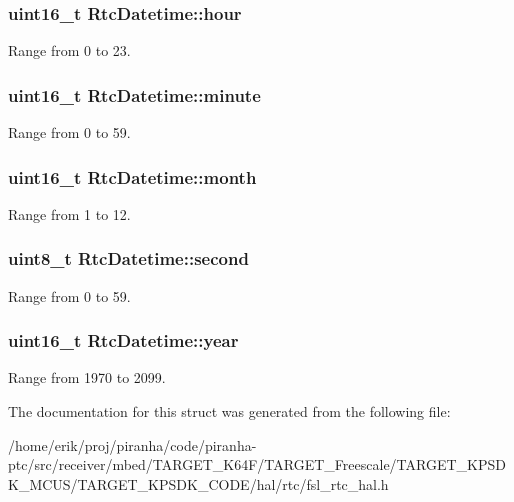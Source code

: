 \subsubsection[{\texorpdfstring{hour}{hour}}]{\setlength{\rightskip}{0pt plus 5cm}uint16\+\_\+t Rtc\+Datetime\+::hour}\hypertarget{structRtcDatetime_accc5c6b219d1efc080c6a10200411314}{}\label{structRtcDatetime_accc5c6b219d1efc080c6a10200411314}
Range from 0 to 23. 
\subsubsection[{\texorpdfstring{minute}{minute}}]{\setlength{\rightskip}{0pt plus 5cm}uint16\+\_\+t Rtc\+Datetime\+::minute}\hypertarget{structRtcDatetime_a5ca18c61b89c54e30d99c69720e76be4}{}\label{structRtcDatetime_a5ca18c61b89c54e30d99c69720e76be4}
Range from 0 to 59. 
\subsubsection[{\texorpdfstring{month}{month}}]{\setlength{\rightskip}{0pt plus 5cm}uint16\+\_\+t Rtc\+Datetime\+::month}\hypertarget{structRtcDatetime_acf10f2a594882e873a074092bfb6fb01}{}\label{structRtcDatetime_acf10f2a594882e873a074092bfb6fb01}
Range from 1 to 12. 
\subsubsection[{\texorpdfstring{second}{second}}]{\setlength{\rightskip}{0pt plus 5cm}uint8\+\_\+t Rtc\+Datetime\+::second}\hypertarget{structRtcDatetime_a4ce9fbd6cfb0dc6dfbe73453b7f557c7}{}\label{structRtcDatetime_a4ce9fbd6cfb0dc6dfbe73453b7f557c7}
Range from 0 to 59. 
\subsubsection[{\texorpdfstring{year}{year}}]{\setlength{\rightskip}{0pt plus 5cm}uint16\+\_\+t Rtc\+Datetime\+::year}\hypertarget{structRtcDatetime_aacb95816fa15796ff868593e554a05b1}{}\label{structRtcDatetime_aacb95816fa15796ff868593e554a05b1}
Range from 1970 to 2099. 

The documentation for this struct was generated from the following file\+:\begin{DoxyCompactItemize}
\item 
/home/erik/proj/piranha/code/piranha-\/ptc/src/receiver/mbed/\+T\+A\+R\+G\+E\+T\+\_\+\+K64\+F/\+T\+A\+R\+G\+E\+T\+\_\+\+Freescale/\+T\+A\+R\+G\+E\+T\+\_\+\+K\+P\+S\+D\+K\+\_\+\+M\+C\+U\+S/\+T\+A\+R\+G\+E\+T\+\_\+\+K\+P\+S\+D\+K\+\_\+\+C\+O\+D\+E/hal/rtc/fsl\+\_\+rtc\+\_\+hal.\+h\end{DoxyCompactItemize}
